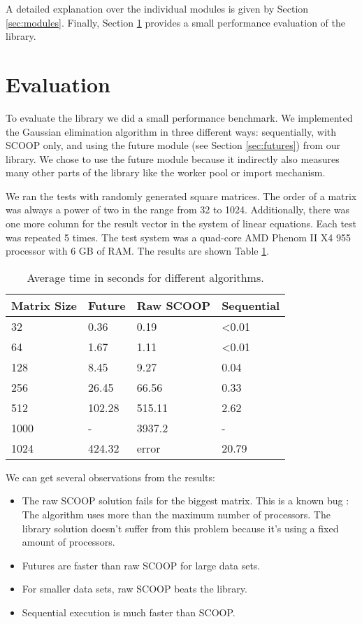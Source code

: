 \documentclass[a4paper,10pt,titlepage]{article}
\begin{document}
A detailed explanation over the individual modules is given by Section \ref{sec:modules}.
Finally, Section \ref{sec:evaluation} provides a small performance evaluation of the library.






\section{Evaluation}
\label {sec:evaluation}

To evaluate the library we did a small performance benchmark.
We implemented the Gaussian elimination algorithm in three different ways: sequentially, with SCOOP only, and using the future module (see Section \ref{sec:futures}) from our library.
We chose to use the future module because it indirectly also measures many other parts of the library like the worker pool or import mechanism.

We ran the tests with randomly generated square matrices.
The order of a matrix was always a power of two in the range from 32 to 1024.
Additionally, there was one more column for the result vector in the system of linear equations.
Each test was repeated 5 times.
The test system was a quad-core AMD Phenom II X4 955 processor with 6 GB of RAM.
The results are shown Table \ref{table:perf-results}.

\begin{table} [h]
\centering
\begin{tabular}{|l|l l l|} 
\hline
Matrix Size & Future & Raw SCOOP & Sequential\\
\hline
32 & 0.36 & 0.19 &  \textless 0.01\\
64 & 1.67 & 1.11 & \textless 0.01\\
128 & 8.45 & 9.27 & 0.04\\
256 & 26.45 & 66.56 & 0.33\\
512 & 102.28 & 515.11 & 2.62\\
1000 & - &  3937.2 & - \\
1024 & 424.32 & error & 20.79 \\
\hline
\end{tabular}
\caption{Average time in seconds for different algorithms.}
\label{table:perf-results}
\end{table}

We can get several observations from the results:

\begin{itemize}
 \item The raw SCOOP solution fails for the biggest matrix.
 This is a known bug \cite{web:scoop-issues}:
 The algorithm uses more than the maximum number of processors.
 The library solution doesn't suffer from this problem because it's using a fixed amount of processors.
 \item Futures are faster than raw SCOOP for large data sets.
 \item For smaller data sets, raw SCOOP beats the library.
 \item Sequential execution is much faster than SCOOP.
\end{itemize}
\end{document}
